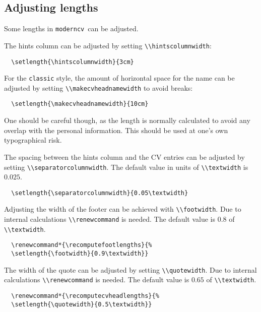 \documentclass[a4paper, 11pt]{article}
\newcommand{\code}[1]{\lstinline!#1!}
\newcommand{\moderncv}{\code{moderncv}}
\newcommand{\Moderncv}{\moderncv~}
\begin{document}
\subsection{Adjusting lengths}\label{subsection:adjusting:lengths}
Some lengths in \Moderncv can be adjusted.

The hints column can be adjusted by setting \code{\\hintscolumnwidth}:
\begin{lstlisting}
  \setlength{\hintscolumnwidth}{3cm}
\end{lstlisting}

For the \code{classic} style, the amount of horizontal space for the name can be adjusted by setting \code{\\makecvheadnamewidth} to avoid breaks:
\begin{lstlisting}
  \setlength{\makecvheadnamewidth}{10cm}
\end{lstlisting}
One should be careful though, as the length is normally calculated to avoid any overlap with the personal information.
This should be used at one's own typographical risk.

The spacing between the hints column and the CV entries can be adjusted by setting \code{\\separatorcolumnwidth}. The default value in units of \code{\\textwidth} is $0.025$.
\begin{lstlisting}
  \setlength{\separatorcolumnwidth}{0.05\textwidth}
\end{lstlisting}

Adjusting the width of the footer can be achieved with \code{\\footwidth}. Due to internal calculations \code{\\renewcommand} is needed. The default value is $0.8$ of \code{\\textwidth}.
\begin{lstlisting}
  \renewcommand*{\recomputefootlengths}{%
  \setlength{\footwidth}{0.9\textwidth}}
\end{lstlisting}

The width of the quote can be adjusted by setting \code{\\quotewidth}. Due to internal calculations \code{\\renewcommand} is needed. The default value is $0.65$ of \code{\\textwidth}.
\begin{lstlisting}
  \renewcommand*{\recomputecvheadlengths}{%
  \setlength{\quotewidth}{0.5\textwidth}}
\end{lstlisting}
\end{document}
